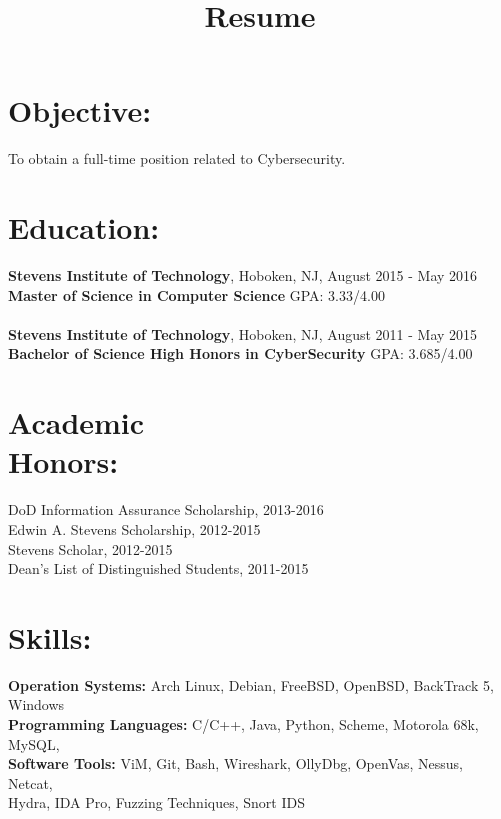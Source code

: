 \documentclass[mm]{res}
\title{Resume}
\begin{document}
 
 
 
\address{{\bf Present Address} \\ Stevens Institute of Technology \\PO Box S2190 \\ 1 Castle Point on the Hudson \\ Hoboken, NJ 07030 }
\address{{\bf Permanent Address} \\ 56 Line Road \\ Holmdel, NJ 07733 \\ Cell: (732) 320-1706 \\ ntrischi@stevens.edu }
\begin{resume} 
 
\section{Objective:} 
To obtain a full-time position related to Cybersecurity.

\section{Education:}
{\bf Stevens Institute of Technology}, Hoboken, NJ, August 2015 - May 2016 \\
{\bf Master of Science in Computer Science} GPA: 3.33/4.00
\\
\\
{\bf Stevens Institute of Technology}, Hoboken, NJ, August 2011 - May 2015 \\
{\bf Bachelor of Science High Honors in CyberSecurity} GPA: 3.685/4.00

\section{Academic \\ Honors:} 
DoD Information Assurance Scholarship, 2013-2016 \\
Edwin A. Stevens Scholarship, 2012-2015 \\
Stevens Scholar, 2012-2015 \\
Dean's List of Distinguished Students, 2011-2015

\section{Skills:}
{\bf Operation Systems:} Arch Linux, Debian, FreeBSD, OpenBSD, BackTrack 5, Windows \\
{\bf Programming Languages:} C/C++, Java, Python, Scheme, Motorola 68k, MySQL,\\
{\bf Software Tools:} ViM, Git, Bash, Wireshark, OllyDbg, OpenVas, Nessus, Netcat, \\ 
Hydra, IDA Pro, Fuzzing Techniques, Snort IDS


\end{resume}
\end{document}
